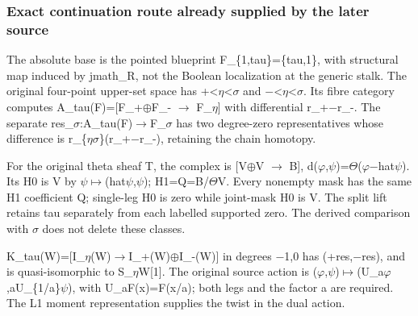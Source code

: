 \subsubsection{Exact continuation route already supplied by the later
source}\label{exact-continuation-route-already-supplied-by-the-later-source}

The absolute base is the pointed blueprint F\_\{1,tau\}=\{tau,1\}, with
structural map induced by jmath\_R, not the Boolean localization at the
generic stalk. The original four-point upper-set space has
+<\allowbreak{}\ensuremath{η}\allowbreak{}<\allowbreak{}\ensuremath{σ}\allowbreak{}
and
\allowbreak{}\ensuremath{−}\allowbreak{}<\allowbreak{}\ensuremath{η}\allowbreak{}<\allowbreak{}\ensuremath{σ}\allowbreak{}.
Its fibre category computes
A\_tau(F)=[F\_+\allowbreak{}\ensuremath{⊕}\allowbreak{}F\_-
\allowbreak{}\ensuremath{→}\allowbreak{}
F\_\allowbreak{}\ensuremath{η}\allowbreak{}] with differential
r\_+\allowbreak{}\ensuremath{−}\allowbreak{}r\_-. The separate
res\_\allowbreak{}\ensuremath{σ}\allowbreak{}:A\_tau(F)\allowbreak{}\ensuremath{→}\allowbreak{}F\_\allowbreak{}\ensuremath{σ}\allowbreak{}
has two degree-zero representatives whose difference is
r\_\{\allowbreak{}\ensuremath{η}\allowbreak{}\allowbreak{}\ensuremath{σ}\allowbreak{}\}(r\_+\allowbreak{}\ensuremath{−}\allowbreak{}r\_-),
retaining the chain homotopy.

For the original theta sheaf T, the complex is
[V\allowbreak{}\ensuremath{⊕}\allowbreak{}V
\allowbreak{}\ensuremath{→}\allowbreak{} B{]},
d(\allowbreak{}\ensuremath{φ}\allowbreak{},\allowbreak{}\ensuremath{ψ}\allowbreak{})=\allowbreak{}\ensuremath{Θ}\allowbreak{}(\allowbreak{}\ensuremath{φ}\allowbreak{}\allowbreak{}\ensuremath{−}\allowbreak{}hat\allowbreak{}\ensuremath{ψ}\allowbreak{}).
Its H0 is V by
\allowbreak{}\ensuremath{ψ}\allowbreak{}\allowbreak{}\ensuremath{↦}\allowbreak{}(hat\allowbreak{}\ensuremath{ψ}\allowbreak{},\allowbreak{}\ensuremath{ψ}\allowbreak{});
H1=Q=B/\allowbreak{}\ensuremath{Θ}\allowbreak{}V. Every nonempty mask
has the same H1 coefficient Q; single-leg H0 is zero while joint-mask H0
is V. The split lift retains tau separately from each labelled supported
zero. The derived comparison with
\allowbreak{}\ensuremath{σ}\allowbreak{} does not delete these classes.

K\_tau(W)=[I\_\allowbreak{}\ensuremath{η}\allowbreak{}(W)\allowbreak{}\ensuremath{→}\allowbreak{}I\_+(W)\allowbreak{}\ensuremath{⊕}\allowbreak{}I\_-(W)]
in degrees \allowbreak{}\ensuremath{−}\allowbreak{}1,0 has
(+res,\allowbreak{}\ensuremath{−}\allowbreak{}res), and is
quasi-isomorphic to S\_\allowbreak{}\ensuremath{η}\allowbreak{}W[1]. The
original source action is
(\allowbreak{}\ensuremath{φ}\allowbreak{},\allowbreak{}\ensuremath{ψ}\allowbreak{})\allowbreak{}\ensuremath{↦}\allowbreak{}(U\_a\allowbreak{}\ensuremath{φ}\allowbreak{},aU\_\{1/a\}\allowbreak{}\ensuremath{ψ}\allowbreak{}),
with U\_aF(x)=F(x/a); both legs and the factor a are required. The L1
moment representation supplies the twist in the dual action.

